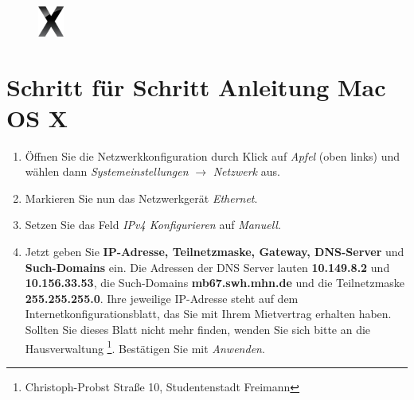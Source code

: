 \documentclass[a4paper,12pt]{scrartcl}
\begin{document}
\newpage
\enlargethispage{20pt}



\begin{figure}[t!]
	\raggedleft
	\vspace{-20pt}
	\includegraphics[height=1cm,keepaspectratio]{Bilder/OSXLeopard}
	\vspace{-30pt}
\end{figure}
\section*{Schritt für Schritt Anleitung Mac OS X}
\begin{enumerate}
    \item Öffnen Sie die Netzwerkkonfiguration durch Klick auf \emph{Apfel} (oben links) und wählen dann \emph{Systemeinstellungen} $\rightarrow$ \emph{Netzwerk} aus.
    \item Markieren Sie nun das Netzwerkgerät \emph{Ethernet}.
    \item Setzen Sie das Feld \emph{IPv4 Konfigurieren} auf \emph{Manuell}.
    \item Jetzt geben Sie \textbf{IP-Adresse, Teilnetzmaske, Gateway, DNS-Server} und \textbf{Such-Domains} ein. Die Adressen der DNS Server lauten \textbf{10.149.8.2} und \textbf{10.156.33.53}, die Such-Domains \textbf{mb67.swh.mhn.de} und die Teilnetzmaske \textbf{255.255.255.0}. Ihre jeweilige IP-Adresse steht auf dem Internetkonfigurationsblatt, das Sie mit Ihrem Mietvertrag erhalten haben. Sollten Sie dieses Blatt nicht mehr finden, wenden Sie sich bitte an die Hausverwaltung \footnote{Christoph-Probst Straße 10, Studentenstadt Freimann}. Bestätigen Sie mit \emph{Anwenden}.
      \begin{figure}[h!]
      \centering
        \begin{minipage}[c]{0.38\linewidth}
          \centering

\end{minipage}
\end{figure}
\end{enumerate}
\end{document}
